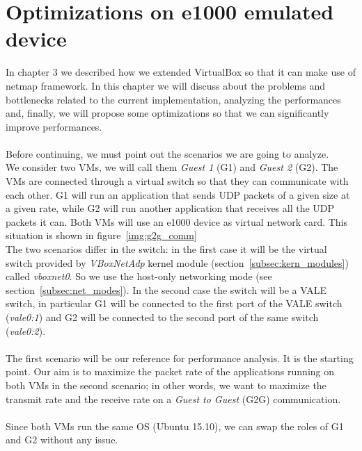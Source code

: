 \documentclass[a4paper, 12pt, titlepage]{report}
\begin{document}
\chapter{Optimizations on e1000 emulated device}
In chapter 3 we described how we extended VirtualBox so that it can make use of netmap framework. In this chapter we will discuss about the problems and bottlenecks related to the current implementation, analyzing the performances and, finally, we will propose some optimizations so that we can significantly improve performances. 
\\
\\
Before continuing, we must point out the scenarios we are going to analyze.
\\
We consider two VMs, we will call them \textit{Guest 1} (G1) and \textit{Guest 2} (G2). The VMs are connected through a virtual switch so that they can communicate with each other. G1 will run an application that sends UDP packets of a given size at a given rate, while G2 will run another application that receives all the UDP packets it can. Both VMs will use an e1000 device as virtual network card. This situation is shown in figure~\ref{img:g2g_comm} 
\\
The two scenarios differ in the switch: in the first case it will be the virtual switch provided by \textit{VBoxNetAdp} kernel module (section~\ref{subsec:kern_modules}) called \textit{vboxnet0}. So we use the host-only networking mode (see section~\ref{subsec:net_modes}). In the second case the switch will be a VALE switch, in particular G1 will be connected to the first port of the VALE switch (\textit{vale0:1}) and G2 will be connected to the second port of the same switch (\textit{vale0:2}).
\\
\\
The first scenario will be our reference for performance analysis. It is the starting point. Our aim is to maximize the packet rate of the applications running on both VMs in the second scenario; in other words, we want to maximize the transmit rate and the receive rate on a \textit{Guest to Guest} (G2G) communication.
\\
\\
Since both VMs run the same OS (Ubuntu 15.10), we can swap the roles of G1 and G2 without any issue.
\end{document}
